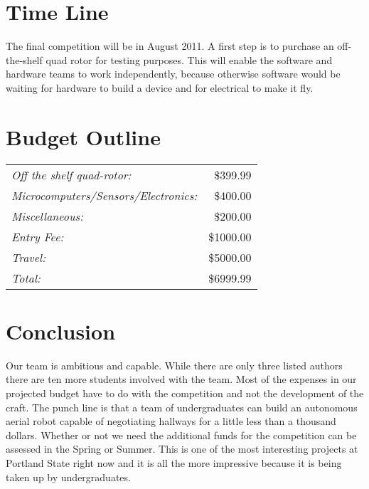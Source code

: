 \documentclass{article}
\begin{document}
\section{Time Line}

The final competition will be in August 2011. A first step is to purchase an off-the-shelf quad rotor for testing purposes. This will enable the software and hardware teams to work independently, because otherwise software would be waiting for hardware to build a device and for electrical to make it fly. 
\section{Budget Outline}

\begin{tabular}[t]{lr}
\it Off the shelf quad-rotor:           &\$399.99\\
\it Microcomputers/Sensors/Electronics: &\$400.00\\
\it Miscellaneous:                       &\$200.00\\
\it Entry Fee:                          &\$1000.00\\
\it Travel:                             &\$5000.00\\\hline
\it Total:                              &\$6999.99\\
\end{tabular}

\section{Conclusion}

Our team is ambitious and capable. While there are only three listed authors there are ten more students involved with the team. Most of the expenses in our projected budget have to do with the competition and not the development of the craft. The punch line is that a team of undergraduates can build an autonomous aerial robot capable of negotiating hallways for a little less than a thousand dollars. Whether or not we need the additional funds for the competition can be assessed in the Spring or Summer. This is one of the most interesting projects at Portland State right now and it is all the more impressive because it is being taken up by undergraduates. 
\end{document}
